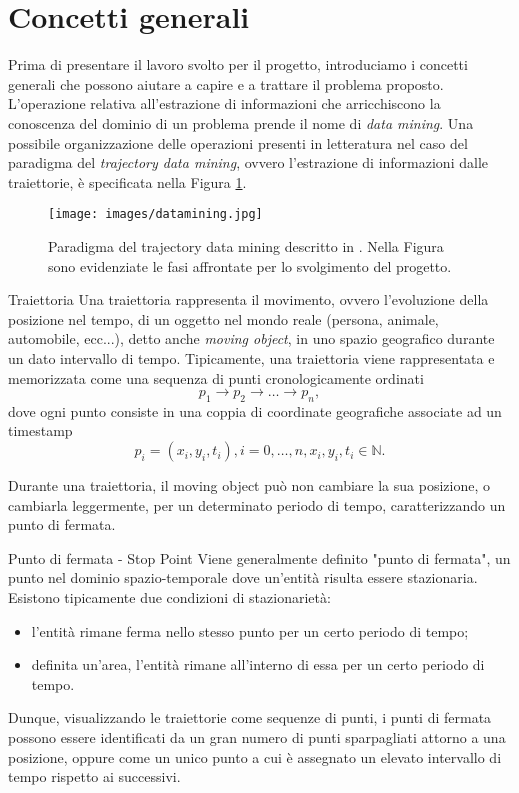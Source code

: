 \documentclass[12pt]{article}
\begin{document}
\section{Concetti generali}
Prima di presentare il lavoro svolto per il progetto, introduciamo i concetti generali che possono aiutare a capire e a trattare il problema proposto.\\
L’operazione relativa all’estrazione di informazioni che arricchiscono la conoscenza
del dominio di un problema prende il nome di \emph{data mining}. Una possibile
organizzazione delle operazioni presenti in letteratura nel caso del paradigma del \emph{trajectory data mining}, ovvero l'estrazione di informazioni dalle traiettorie, è specificata nella Figura \ref{trajectorydatamining}.
\begin{figure}
    \centering
    \texttt{[image: images/datamining.jpg]}
    \caption{Paradigma del trajectory data mining descritto in \cite{TrajectoryDataMining}. Nella Figura sono evidenziate le fasi affrontate per lo svolgimento del progetto.}
    \label{trajectorydatamining}
\end{figure}
\begin{definition}{Traiettoria}{}
    Una traiettoria rappresenta il movimento, ovvero l'evoluzione della posizione nel tempo, di un oggetto nel mondo reale (persona, animale, automobile, ecc...), detto anche \emph{moving object}, in uno spazio geografico durante un dato intervallo di tempo.
    Tipicamente, una traiettoria viene rappresentata e memorizzata come una sequenza di punti cronologicamente ordinati $$p_1 \rightarrow p_2 \rightarrow \dots \rightarrow p_n,$$ dove ogni punto consiste in una coppia di coordinate geografiche associate ad un timestamp $$p_i=(x_i,y_i,t_i), i=0,\dots,n,x_i,y_i,t_i \in \mathbb{N}.$$
\end{definition}
Durante una traiettoria, il moving object può non cambiare la sua posizione, o cambiarla leggermente, per un determinato periodo di tempo, caratterizzando un punto di fermata.
\begin{definition}{Punto di fermata - Stop Point}{}
    Viene generalmente definito "punto di fermata", un punto nel dominio spazio-temporale dove un'entità risulta essere stazionaria. Esistono tipicamente due condizioni di stazionarietà:
    \begin{itemize}
        \item l'entità rimane ferma nello stesso punto per un certo periodo di tempo;
        \item definita un'area, l'entità rimane all'interno di essa per un certo periodo di tempo.
    \end{itemize}
    Dunque, visualizzando le traiettorie come sequenze di punti, i punti di fermata possono essere identificati da un gran numero di punti sparpagliati attorno a una posizione, oppure come un unico punto a cui è assegnato un elevato intervallo di tempo rispetto ai successivi.
    \label{stop_point}
\end{definition}
\end{document}
